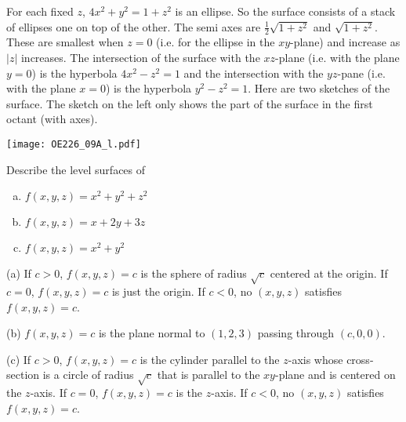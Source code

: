 \begin{solution} 
For each fixed $z$, $4x^2+y^2=1+z^2$ is an ellipse. So the surface 
consists of a stack of ellipses one on top of the other. The semi axes are
$\frac{1}{2}\sqrt{1+z^2}$ and $\sqrt{1+z^2}$. These are smallest when $z=0$
(i.e. for the ellipse in the $xy$-plane) and increase as $|z|$ increases.
The intersection of the surface with the $xz$-plane (i.e. with the plane $y=0$) is the hyperbola $4x^2-z^2=1$ and the intersection with
the $yz$-pane (i.e. with the plane $x=0$) is the hyperbola $y^2-z^2=1$. 
Here are two sketches of the surface. The sketch on the left only shows 
the part of the surface in the first octant  (with axes).
\begin{center}
   \texttt{[image: OE226\_09A\_l.pdf]}\qquad\qquad
\end{center}

\end{solution}

\begin{question}
Describe the level surfaces of
\begin{enumerate}[(a)]
\item $f(x,y,z)=x^2+y^2+z^2$
\item $f(x,y,z)=x+2y+3z$
\item $f(x,y,z)=x^2+y^2$
\end{enumerate}
\end{question}

%

\begin{answer}
(a)
 If $c>0$, $f(x,y,z)=c$
is the sphere of radius $\sqrt{c}$ centered at the origin. 
If $c=0$, $f(x,y,z)=c$ is just the origin. If $c<0$, no
$(x,y,z)$ satisfies $f(x,y,z)=c$.

(b) $f(x,y,z)=c$ is the plane normal to 
$(1,2,3)$ passing through $(c,0,0)$.

(c) If $c>0$, $f(x,y,z)=c$ is the cylinder 
parallel to the $z$-axis whose cross-section is a circle of 
radius $\sqrt{c}$ that is parallel to the $xy$-plane and is centered on the
$z$-axis. 
If $c=0$, $f(x,y,z)=c$ is the $z$-axis. If $c<0$, no
$(x,y,z)$ satisfies $f(x,y,z)=c$. 

\end{answer}

